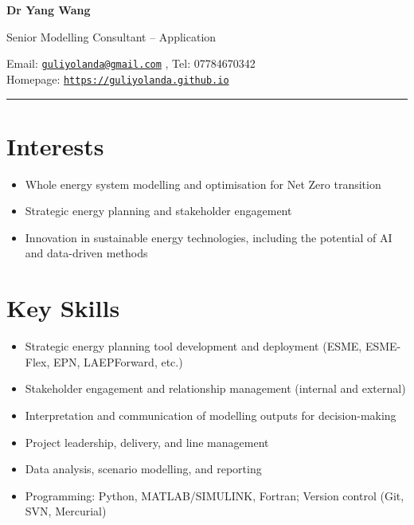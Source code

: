 \documentclass[letterpaper]{article}
\def\name{Dr Yang Wang}
\begin{document}

\centerline{\LARGE \bf Dr Yang Wang}
\centerline{\large Senior Modelling Consultant – Application}
\vspace{0.1in}


\begin{minipage}{\linewidth}
\begin{center}
Email: \href{mailto:guliyolanda@gmail.com}{\tt guliyolanda@gmail.com} , Tel: 07784670342 \\
Homepage:  \href{https://guliyolanda.github.io}{\tt https://guliyolanda.github.io} \\
\end{center}
\end{minipage}

\vspace{0pt}
\rule{\textwidth}{1pt}

\vspace{-12pt}
\section*{Interests}
\vspace{-10pt}
\begin{itemize}
\item Whole energy system modelling and optimisation for Net Zero transition
\item Strategic energy planning and stakeholder engagement
\item Innovation in sustainable energy technologies, including the potential of AI and data-driven methods
\end{itemize}

\vspace{-12pt}
\section*{Key Skills}
\begin{itemize}
\item Strategic energy planning tool development and deployment (ESME, ESME-Flex, EPN, LAEPForward, etc.)
\item Stakeholder engagement and relationship management (internal and external)
\item Interpretation and communication of modelling outputs for decision-making
\item Project leadership, delivery, and line management
\item Data analysis, scenario modelling, and reporting
\item Programming: Python, MATLAB/SIMULINK, Fortran; Version control (Git, SVN, Mercurial)
\end{itemize}
\end{document}
